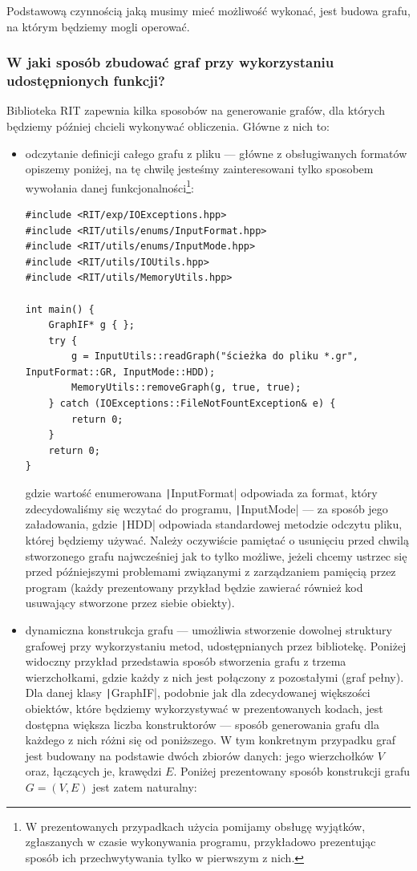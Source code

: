 Podstawową czynnością jaką musimy mieć możliwość wykonać, jest budowa grafu, na którym będziemy mogli operować. 

\subsubsection{W jaki sposób zbudować graf przy wykorzystaniu udostępnionych funkcji?}

Biblioteka \textsc{RIT} zapewnia kilka sposobów na generowanie grafów, dla których będziemy później chcieli wykonywać obliczenia. Główne z nich to:
\begin{itemize}
	\item odczytanie definicji całego grafu z pliku --- główne z obsługiwanych formatów opiszemy poniżej, na tę chwilę jesteśmy zainteresowani tylko sposobem wywołania danej funkcjonalności\footnote{W prezentowanych przypadkach użycia pomijamy obsługę wyjątków, zgłaszanych w czasie wykonywania programu, przykładowo prezentując sposób ich przechwytywania tylko w pierwszym z nich.}:
	
	\begin{verbatim}
#include <RIT/exp/IOExceptions.hpp>
#include <RIT/utils/enums/InputFormat.hpp>
#include <RIT/utils/enums/InputMode.hpp>
#include <RIT/utils/IOUtils.hpp>
#include <RIT/utils/MemoryUtils.hpp>

int main() {
	GraphIF* g { };
	try {
		g = InputUtils::readGraph("ścieżka do pliku *.gr", InputFormat::GR, InputMode::HDD);
		MemoryUtils::removeGraph(g, true, true);
	} catch (IOExceptions::FileNotFountException& e) {
		return 0;
	}
	return 0;
}
	\end{verbatim}
	
	gdzie wartość enumerowana \texttt|InputFormat| odpowiada za format, który zdecydowaliśmy się wczytać do programu, \texttt|InputMode| --- za sposób jego załadowania, gdzie \texttt|HDD| odpowiada standardowej metodzie odczytu pliku, której będziemy używać. Należy oczywiście pamiętać o usunięciu przed chwilą stworzonego grafu najwcześniej jak to tylko możliwe, jeżeli chcemy ustrzec się przed późniejszymi problemami związanymi z zarządzaniem pamięcią przez program (każdy prezentowany przykład będzie zawierać również kod usuwający stworzone przez siebie obiekty).
	\item dynamiczna konstrukcja grafu --- umożliwia stworzenie dowolnej struktury grafowej przy wykorzystaniu metod, udostępnianych przez bibliotekę. Poniżej widoczny przykład przedstawia sposób stworzenia grafu z trzema wierzchołkami, gdzie każdy z nich jest połączony z pozostałymi (graf pełny). Dla danej klasy \texttt|GraphIF|, podobnie jak dla zdecydowanej większości obiektów, które będziemy wykorzystywać w prezentowanych kodach, jest dostępna większa liczba konstruktorów --- sposób generowania grafu dla każdego z nich różni się od poniższego. W tym konkretnym przypadku graf jest budowany na podstawie dwóch zbiorów danych: jego wierzchołków $V$ oraz, łączących je, krawędzi $E$. Poniżej prezentowany sposób konstrukcji grafu $G = \left( V, E \right)$ jest zatem naturalny:
	

\end{itemize}
